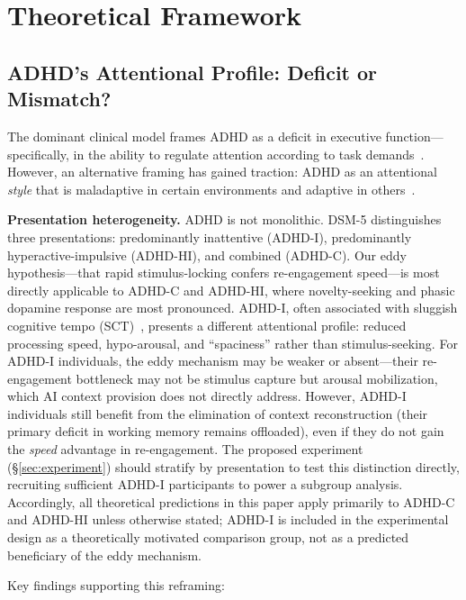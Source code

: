 \documentclass[sigconf,nonacm]{acmart}
\begin{document}
\section{Theoretical Framework}
\label{sec:framework}

\subsection{ADHD's Attentional Profile: Deficit or Mismatch?}

The dominant clinical model frames ADHD as a deficit in executive function---specifically, in the ability to regulate attention according to task demands~\cite{barkley1997}. However, an alternative framing has gained traction: ADHD as an attentional \emph{style} that is maladaptive in certain environments and adaptive in others~\cite{hupfeld2019}.

\textbf{Presentation heterogeneity.} ADHD is not monolithic. DSM-5 distinguishes three presentations: predominantly inattentive (ADHD-I), predominantly hyperactive-impulsive (ADHD-HI), and combined (ADHD-C). Our eddy hypothesis---that rapid stimulus-locking confers re-engagement speed---is most directly applicable to ADHD-C and ADHD-HI, where novelty-seeking and phasic dopamine response are most pronounced. ADHD-I, often associated with sluggish cognitive tempo (SCT)~\cite{barkley2014sct}, presents a different attentional profile: reduced processing speed, hypo-arousal, and ``spaciness'' rather than stimulus-seeking. For ADHD-I individuals, the eddy mechanism may be weaker or absent---their re-engagement bottleneck may not be stimulus capture but arousal mobilization, which AI context provision does not directly address. However, ADHD-I individuals still benefit from the elimination of context reconstruction (their primary deficit in working memory remains offloaded), even if they do not gain the \emph{speed} advantage in re-engagement. The proposed experiment (\S\ref{sec:experiment}) should stratify by presentation to test this distinction directly, recruiting sufficient ADHD-I participants to power a subgroup analysis. Accordingly, all theoretical predictions in this paper apply primarily to ADHD-C and ADHD-HI unless otherwise stated; ADHD-I is included in the experimental design as a theoretically motivated comparison group, not as a predicted beneficiary of the eddy mechanism.

Key findings supporting this reframing:
\end{document}
